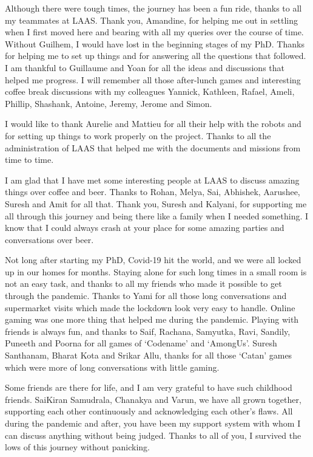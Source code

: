 \documentclass[english,a4paper,11pt,twoside]{StyleThese}
\begin{document}
Although there were tough times, the journey has been a fun ride, thanks to all my teammates at LAAS. Thank you, Amandine, for helping me out in settling when I first moved here and bearing with all my queries over the course of time. Without Guilhem, I would have lost in the beginning stages of my PhD. Thanks for helping me to set up things and for answering all the questions that followed. I am thankful to Guillaume and Yoan for all the ideas and discussions that helped me progress. I will remember all those after-lunch games and interesting coffee break discussions with my colleagues Yannick, Kathleen, Rafael, Ameli, Phillip, Shashank, Antoine, Jeremy, Jerome and Simon.

I would like to thank Aurelie and Mattieu for all their help with the robots and for setting up things to work properly on the project. Thanks to all the administration of LAAS that helped me with the documents and missions from time to time. 

I am glad that I have met some interesting people at LAAS to discuss amazing things over coffee and beer. Thanks to Rohan, Melya, Sai, Abhishek, Aarushee, Suresh and Amit for all that. Thank you, Suresh and Kalyani, for supporting me all through this journey and being there like a family when I needed something. I know that I could always crash at your place for some amazing parties and conversations over beer.  

Not long after starting my PhD, Covid-19 hit the world, and we were all locked up in our homes for months. Staying alone for such long times in a small room is not an easy task, and thanks to all my friends who made it possible to get through the pandemic. Thanks to Yami for all those long conversations and supermarket visits which made the lockdown look very easy to handle. Online gaming was one more thing that helped me during the pandemic. Playing with friends is always fun, and thanks to Saif, Rachana, Samyutka, Ravi, Sandily, Puneeth and Poorna for all games of `Codename' and `AmongUs'. Suresh Santhanam, Bharat Kota and Srikar Allu, thanks for all those `Catan' games which were more of long conversations with little gaming.

Some friends are there for life, and I am very grateful to have such childhood friends. SaiKiran Samudrala, Chanakya and Varun, we have all grown together, supporting each other continuously and acknowledging each other's flaws. All during the pandemic and after, you have been my support system with whom I can discuss anything without being judged. Thanks to all of you, I survived the lows of this journey without panicking.  
\end{document}
